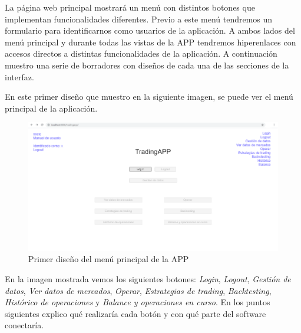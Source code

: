 La página web principal mostrará un menú con distintos botones que implementan funcionalidades diferentes. Previo a este menú tendremos un formulario para identificarnos como usuarios de la aplicación. A ambos lados del menú principal y durante todas las vistas de la APP tendremos hiperenlaces con accesos directos a distintas funcionalidades de la aplicación. A continuación muestro una serie de borradores con diseños de cada una de las secciones de la interfaz.\newline

En este primer diseño que muestro en la siguiente imagen, se puede ver el menú principal de la aplicación.\newline

\begin{figure}[h] 
	\includegraphics[width=1.2\textwidth]{imagenes/menu_principal.png}
	\caption{Primer diseño del menú principal de la APP} \label{menu_principal}
\end{figure}

En la imagen mostrada vemos los siguientes botones: \textit{Login}, \textit{Logout}, \textit{Gestión de datos}, \textit{Ver datos de mercados}, \textit{Operar}, \textit{Estrategias de trading}, \textit{Backtesting}, \textit{Histórico de operaciones} y \textit{Balance y operaciones en curso}. En los puntos siguientes explico qué realizaría cada botón y con qué parte del software conectaría.\newline

